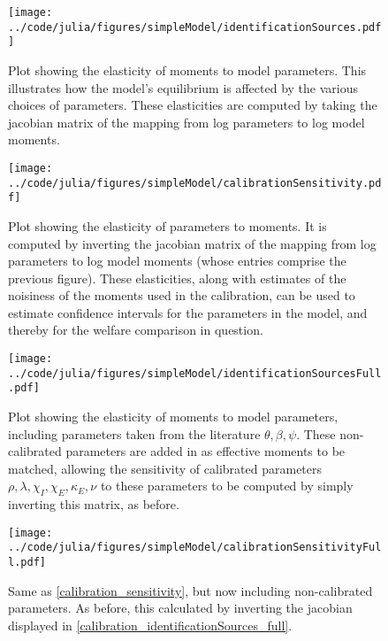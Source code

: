\documentclass[11pt,english]{article}
\theoremstyle{remark}
\begin{document}
\begin{figure}[]
	\texttt{[image: ../code/julia/figures/simpleModel/identificationSources.pdf]}
	\caption{Plot showing the elasticity of moments to model parameters. This illustrates how the model's equilibrium is affected by the various choices of parameters. These elasticities are computed by taking the jacobian matrix of the mapping from log parameters to log model moments.}
	\label{calibration_identificationSources}
\end{figure}

\begin{figure}[]
	\texttt{[image: ../code/julia/figures/simpleModel/calibrationSensitivity.pdf]}
	\caption{Plot showing the elasticity of parameters to moments. It is computed by inverting the jacobian matrix of the mapping from log parameters to log model moments (whose entries comprise the previous figure). These elasticities, along with estimates of the noisiness of the moments used in the calibration, can be used to estimate confidence intervals for the parameters in the model, and thereby for the welfare comparison in question.}
	\label{calibration_sensitivity}
\end{figure}

\begin{figure}[]
	\texttt{[image: ../code/julia/figures/simpleModel/identificationSourcesFull.pdf]}
	\caption{Plot showing the elasticity of moments to model parameters, including parameters taken from the literature $\theta , \beta, \psi$. These non-calibrated parameters are added in as effective moments to be matched, allowing the sensitivity of calibrated parameters $\rho, \lambda, \chi_I, \chi_E, \kappa_E, \nu$ to these parameters to be computed by simply inverting this matrix, as before.}
	\label{calibration_identificationSources_full}
\end{figure}

\begin{figure}[]
	\texttt{[image: ../code/julia/figures/simpleModel/calibrationSensitivityFull.pdf]}
	\caption{Same as \autoref{calibration_sensitivity}, but now including non-calibrated parameters. As before, this calculated by inverting the jacobian displayed in \autoref{calibration_identificationSources_full}.}
	\label{calibration_sensitivity_full}
\end{figure}
\end{document}
